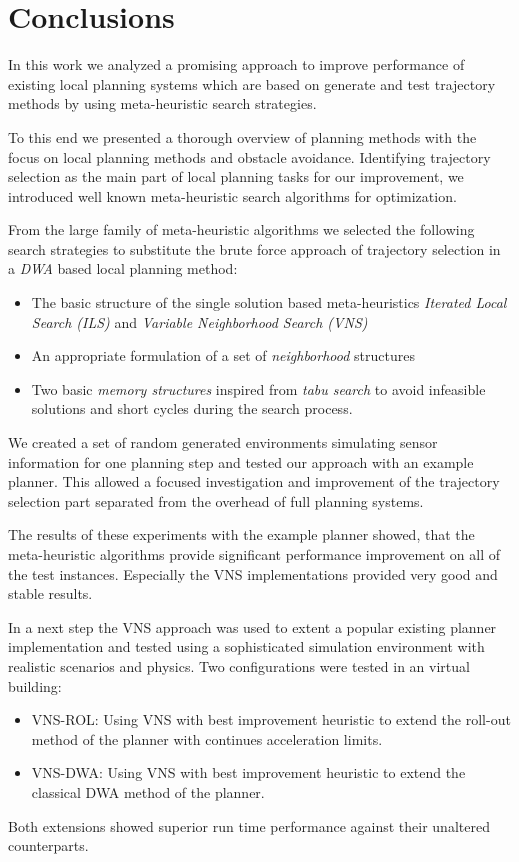 \chapter{Conclusions}\label{ch:conc}
In this work we analyzed a promising approach to improve performance of existing local planning systems which are based on generate and test trajectory methods by using meta-heuristic search strategies.

To this end we presented a thorough overview of planning methods with the focus on local planning methods and obstacle avoidance. 
Identifying trajectory selection as the main part of local planning tasks for our improvement, we introduced well known meta-heuristic search algorithms for optimization.

From the large family of meta-heuristic algorithms we selected the following search strategies to substitute the brute force approach of trajectory selection in a \emph{DWA} based local planning method:
\begin{itemize}
\item The basic structure of the single solution based meta-heuristics \emph{Iterated Local Search (ILS)} and \emph{Variable Neighborhood Search (VNS)}  
\item An appropriate formulation of a set of \emph{neighborhood} structures
\item Two basic \emph{memory structures} inspired from \emph{tabu search} to avoid infeasible solutions and short cycles during the search process. 
\end{itemize}

We created a set of random generated environments simulating sensor information for one planning step and tested our approach with an example planner. 
This allowed a focused investigation and improvement of the trajectory selection part separated from the overhead of full planning systems.

The results of these experiments with the example planner showed, that the meta-heuristic algorithms provide significant performance improvement on all of the test instances. Especially the VNS implementations provided very good and stable results. 

In a next step the VNS approach was used to extent a popular existing planner implementation and tested using a sophisticated simulation environment with realistic scenarios and physics. Two configurations were tested in an virtual building:
\begin{itemize}
\item VNS-ROL: Using VNS with best improvement heuristic to extend the roll-out method of the planner with continues acceleration limits.
\item VNS-DWA: Using VNS with best improvement heuristic to extend the classical DWA method of the planner.
\end{itemize}
Both extensions showed superior run time performance against their unaltered counterparts.

